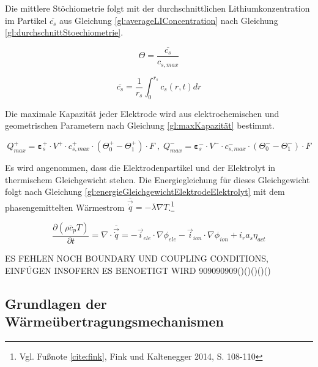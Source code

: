 Die mittlere Stöchiometrie folgt mit der durchschnittlichen Lithiumkonzentration im Partikel $\overline{c_{s}}$ aus Gleichung \ref{gl:averageLIConcentration} nach Gleichung \ref{gl:durchschnittStoechiometrie}.

\begin{equation}
	\Theta = \frac{\overline{c_{s}}}{c_{s,max}} \label{gl:durchschnittStoechiometrie}
\end{equation}

\begin{equation}
	\overline{c_{s}} = \frac{1}{r_{s}} \int_{0}^{r_{s}} c_{s}(r,t) dr \label{gl:averageLIConcentration}
\end{equation}

Die maximale Kapazität jeder Elektrode wird aus elektrochemischen und geometrischen Parametern nach Gleichung \ref{gl:maxKapazität} bestimmt.

\begin{equation}
	Q^{+}_{max} = \mathbf{\varepsilon}^{+}_{s}\cdot V^{+} \cdot c_{s,max}^{+} \cdot (\Theta^{+}_{0} - \Theta^{+}_{1}) \cdot F \; , \; Q^{-}_{max} =  \mathbf{\varepsilon}^{-}_{s}\cdot V^{-}\cdot c^{-}_{s,max}\cdot (\Theta^{-}_{0} - \Theta^{-}_{1}) \cdot F \label{gl:maxKapazität}
\end{equation}

Es wird angenommen, dass die Elektrodenpartikel und der Elektrolyt in thermischem Gleichgewicht stehen. Die Energiegleichung für dieses Gleichgewicht folgt nach Gleichung \ref{gl:energieGleichgewichtElektrodeElektrolyt} mit dem phasengemittelten Wärmestrom $\overline{\vec{\dot{q}}} = -\overline{\lambda} \nabla T$.\footnote{Vgl. Fußnote \ref{cite:fink}, Fink und Kaltenegger 2014, S. 108-110}

\begin{equation}
	\frac{\partial (\overline{\rho c_{p}} T)}{\partial t} = \nabla \cdot \overline{\vec{\dot{q}}} = - \vec{i}_{ele} \cdot \nabla \phi_{ele} - \vec{i}_{ion} \cdot \nabla \phi_{ion} + i_{r} a_{s} \eta_{act} \label{gl:energieGleichgewichtElektrodeElektrolyt}
\end{equation}


ES FEHLEN NOCH BOUNDARY UND COUPLING CONDITIONS, EINFÚGEN INSOFERN ES BENOETIGT WIRD 909090909()()()()()

\newpage
\subsection{Grundlagen der Wärmeübertragungsmechanismen}\label{sub:waermeuebertragung}

